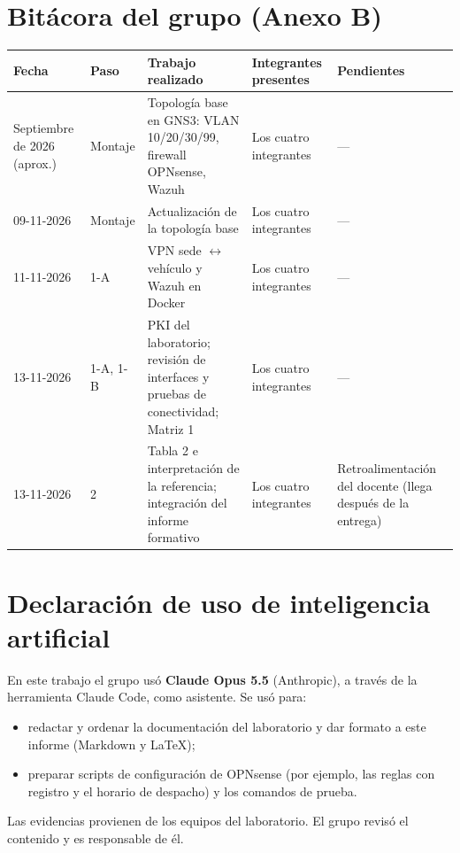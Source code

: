 \documentclass[11pt,a4paper]{article}
\newcommand{\lra}{\ensuremath{\leftrightarrow}}
\begin{document}
\section{Bitácora del grupo (Anexo B)}

{\small
\setlength{\tabcolsep}{4pt}
\begin{longtable}{@{}P{2.4cm}P{1.4cm}P{4.6cm}P{2.6cm}P{3.2cm}@{}}
\toprule
\textbf{Fecha} & \textbf{Paso} & \textbf{Trabajo realizado} & \textbf{Integrantes presentes} & \textbf{Pendientes} \\ \midrule
\endhead
Septiembre de 2026 (aprox.) & Montaje & Topología base en GNS3: VLAN 10/20/30/99, firewall OPNsense, Wazuh & Los cuatro integrantes & — \\
09-11-2026 & Montaje & Actualización de la topología base & Los cuatro integrantes & — \\
11-11-2026 & 1-A & VPN sede \lra{} vehículo y Wazuh en Docker & Los cuatro integrantes & — \\
13-11-2026 & 1-A, 1-B & PKI del laboratorio; revisión de interfaces y pruebas de conectividad; Matriz 1 & Los cuatro integrantes & — \\
13-11-2026 & 2 & Tabla 2 e interpretación de la referencia; integración del informe formativo & Los cuatro integrantes & Retroalimentación del docente (llega después de la entrega) \\ \bottomrule
\end{longtable}
}

\section{Declaración de uso de inteligencia artificial}

En este trabajo el grupo usó \textbf{Claude Opus 5.5} (Anthropic), a través de la herramienta Claude Code, como asistente. Se usó para:

\begin{itemize}
\item redactar y ordenar la documentación del laboratorio y dar formato a este informe (Markdown y \LaTeX);
\item preparar scripts de configuración de OPNsense (por ejemplo, las reglas con registro y el horario de despacho) y los comandos de prueba.
\end{itemize}

Las evidencias provienen de los equipos del laboratorio. El grupo revisó el contenido y es responsable de él.

\newpage
\end{document}
